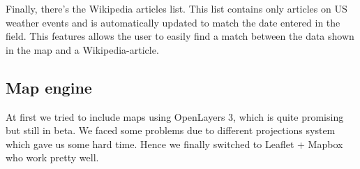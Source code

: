 Finally, there's the Wikipedia articles list. This list contains only articles on US weather events and is automatically updated to match the date entered in the field. This features allows the user to easily find a match between the data shown in the map and a Wikipedia-article.

\subsection{Map engine}
At first we tried to include maps using OpenLayers 3, which is quite promising but still in beta. We faced some problems due to different projections system which gave us some hard time. Hence we finally switched to Leaflet + Mapbox who work pretty well.
